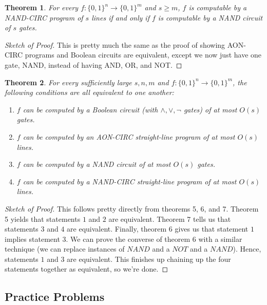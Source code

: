 \documentclass[11pt]{article}
\newtheorem{theorem}{Theorem}
\theoremstyle{definition}
\theoremstyle{remark}
\begin{document}
\begin{theorem}
For every $f:\{0,1\}^n \rightarrow \{0,1\}^m$ and $s \geq m$, $f$ is computable by a NAND-CIRC program of $s$ lines if and only if $f$ is computable by a NAND circuit of $s$ gates.
\end{theorem}
\begin{proof}[Sketch of Proof]
This is pretty much the same as the proof of showing AON-CIRC programs and Boolean circuits are equivalent, except we now just have one gate, NAND, instead of having AND, OR, and NOT.
\end{proof}


\begin{theorem}
For every sufficiently large $s,n,m$ and $f:\{0,1\}^n \rightarrow \{0,1\}^m$, the following conditions are all equivalent to one another:

\begin{enumerate}
\item $f$ can be computed by a Boolean circuit (with $\wedge,\vee,\neg$ gates) of at most $O(s)$ gates.

\item $f$ can be computed by an AON-CIRC straight-line program of at most $O(s)$ lines.

\item $f$ can be computed by a NAND circuit of at most $O(s)$ gates.

\item $f$ can be computed by a NAND-CIRC straight-line program of at most $O(s)$ lines.
\end{enumerate}
\end{theorem}
\begin{proof}[Sketch of Proof]
This follows pretty directly from theorems 5, 6, and 7. Theorem 5 yields that statements $1$ and $2$ are equivalent. Theorem 7 tells us that statements $3$ and $4$ are equivalent. Finally, theorem 6 gives us that statement $1$ implies statement $3$. We can prove the converse of theorem 6 with a similar technique (we can replace instances of $NAND$ and a $NOT$ and a $NAND$). Hence, statements $1$ and $3$ are equivalent. This finishes up chaining up the four statements together as equivalent, so we're done.
\end{proof}


\subsection{Practice Problems}
\end{document}
